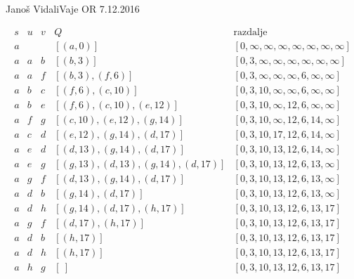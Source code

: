 \begin{naloga}{Janoš Vidali}{Vaje OR 7.12.2016}
\begin{odgovor}
\begin{tabela}
$$
\begin{array}{c|c|c|c|c}
s & u & v & Q & \text{razdalje} \\ \hline
a &   &   & [(a,0)]  & [0, \infty, \infty, \infty, \infty, \infty, \infty, \infty] \\
a & a  &  b & [(b, 3)]  & [0, 3, \infty, \infty, \infty, \infty, \infty, \infty] \\
a & a  &  f & [(b, 3), (f, 6)]  & [0, 3, \infty, \infty, \infty, 6, \infty, \infty] \\
a & b  & c & [(f, 6), (c, 10)]  & [0, 3, 10, \infty, \infty, 6, \infty, \infty] \\
a & b  & e & [(f, 6), (c, 10), (e, 12)]  & [0, 3, 10, \infty, 12, 6, \infty, \infty] \\
a & f  & g & [(c, 10), (e, 12), (g, 14)]  & [0, 3, 10, \infty, 12, 6, 14, \infty] \\
a & c  & d & [(e, 12), (g, 14), (d, 17)]  & [0, 3, 10, 17, 12, 6, 14, \infty] \\
a & e  & d & [(d, 13), (g, 14), (d, 17)]  & [0, 3, 10, 13, 12, 6, 14, \infty] \\
a & e  & g & [(g, 13), (d, 13), (g, 14), (d, 17)]  & [0, 3, 10, 13, 12, 6, 13, \infty] \\
a & g  & f & [(d, 13), (g, 14), (d, 17)]  & [0, 3, 10, 13, 12, 6, 13, \infty] \\
a & d  & b & [(g, 14), (d, 17)]  & [0, 3, 10, 13, 12, 6, 13, \infty] \\
a & d  & h & [(g, 14), (d, 17), (h, 17)]  & [0, 3, 10, 13, 12, 6, 13, 17] \\
a & g  & f & [(d, 17), (h, 17)]  & [0, 3, 10, 13, 12, 6, 13, 17] \\
a & d & b & [(h, 17)]  & [0, 3, 10, 13, 12, 6, 13, 17] \\
a & d & h & [(h, 17)]  & [0, 3, 10, 13, 12, 6, 13, 17] \\
a & h & g & [\ ]  & [0, 3, 10, 13, 12, 6, 13, 17]
\end{array}
$$
\end{tabela}

\end{odgovor}
\end{naloga}

